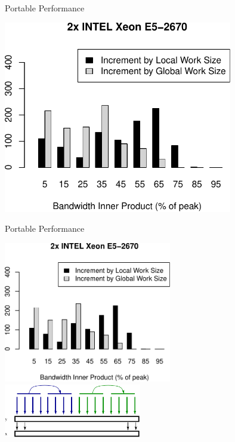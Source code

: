 \begin{frame}{Portable Performance}
  \begin{center} \includegraphics[width=0.75\textwidth]{figures/xeon_cpu_double_hist_itertype_dot} \end{center}
\end{frame}

\begin{frame}{Portable Performance}
  \begin{center} \includegraphics[width=0.55\textwidth]{figures/xeon_cpu_double_hist_itertype_dot} \\[1em]
                 \includegraphics[width=0.45\textwidth]{figures/copy-kernel-cpu-full} 
  \end{center}
\end{frame}




